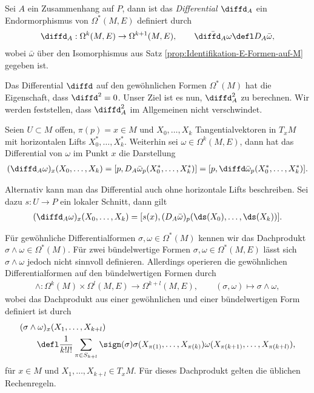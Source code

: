 \documentclass[%
	paper=a5,%
	fleqn,%
	DIV=18,%
	BCOR=0mm,
	fontsize=11pt,
	titlepage=false,%
	bibliography=totoc,
	DIV=18,%
	twoside=true,
	pdftitle=Riemannsche Geometrie,
	pdfauthor=Uwe Semmelmann,
	numbers=noendperiod]%
	{scrbook}
\begin{document}
\begin{defn}
Sei $A$ ein Zusammenhang auf $P$, dann ist das \emph{Differential $\diffd_A$}
ein Endormorphismus von $\Omega^*(M,E)$ definiert durch
\begin{align*}
\diffd_A : \Omega^k(M,E)\to\Omega^{k+1}(M,E),\qquad \bar{\diffd_A \omega} \defl
D_A\bar{\omega},
\end{align*}
wobei $\bar{\omega}$ über den Isomorphismus aus Satz
\ref{prop:Identifikation-E-Formen-auf-M} gegeben ist.\fish
\end{defn}

Das Differential $\diffd$ auf den gewöhnlichen Formen $\Omega^*(M)$ hat die
Eigenschaft, dass $\diffd^2 = 0$. Unser Ziel ist es nun, $\diffd_A^2$ zu
berechnen. Wir werden feststellen, dass $\diffd_A^2$ im Allgemeinen nicht
verschwindet.

\begin{rem}[Bemerkungen.]
\begin{remenum}
\item Seien $U\subset M$ offen, $\pi(p) = x\in M$ und $X_0,\ldots,X_k$
Tangentialvektoren in $T_xM$ mit horizontalen Lifts $X_0^*,\ldots,X_k^*$.
Weiterhin sei $\omega\in\Omega^k(M,E)$, dann hat das Differential von $\omega$
im Punkt $x$ die Darstellung
\begin{align*}
(\diffd_A\omega)_x(X_0,\ldots,X_k) = 
[p,D_A\bar{\omega}_p(X_0^*,\ldots,X_k^*)]= 
[p,\diffd \bar{\omega}_p(X_0^*,\ldots,X_k^*)].
\end{align*}

Alternativ kann man das Differential auch ohne horizontale Lifts beschreiben.
Sei dazu $s: U\to P$ ein lokaler Schnitt, dann gilt
\begin{align*}
(\diffd_A\omega)_x(X_0,\ldots,X_k) = 
[s(x),(D_A \bar{\omega})_p(\ds(X_0),\ldots,\ds(X_k))].
\end{align*}
\item Für gewöhnliche Differentialformen $\sigma,\omega\in\Omega^*(M)$ kennen
wir das Dachprodukt $\sigma\wedge \omega\in\Omega^*(M)$. Für zwei bündelwertige
Formen $\sigma,\omega\in \Omega^*(M,E)$  lässt sich 
$\sigma\wedge\omega$ jedoch nicht sinnvoll definieren. Allerdings operieren
die gewöhnlichen Differentialformen auf den bündelwertigen Formen  durch
\begin{align*}
\wedge : \Omega^k(M)\times \Omega^l(M,E) \to \Omega^{k+l}(M,E),\qquad
(\sigma,\omega) \mapsto \sigma\wedge \omega,
\end{align*}
wobei das Dachprodukt aus einer gewöhnlichen und einer bündelwertigen Form
definiert ist durch
\begin{align*}
&(\sigma\wedge \omega)_x(X_1,\ldots,X_{k+l}) \\ &\qquad \defl 
\frac{1}{k!l!} \sum_{\pi\in S_{k+l}} \sign(\sigma)
\sigma(X_{\pi(1)},\ldots,X_{\pi(k)})\omega(X_{\pi(k+1)},\ldots,X_{\pi(k+l)}),
\end{align*}
für $x\in M$ und $X_1,\ldots,X_{k+l}\in T_xM$. Für dieses Dachprodukt gelten die
üblichen Rechenregeln.\map
\end{remenum}
\end{rem}
\end{document}
